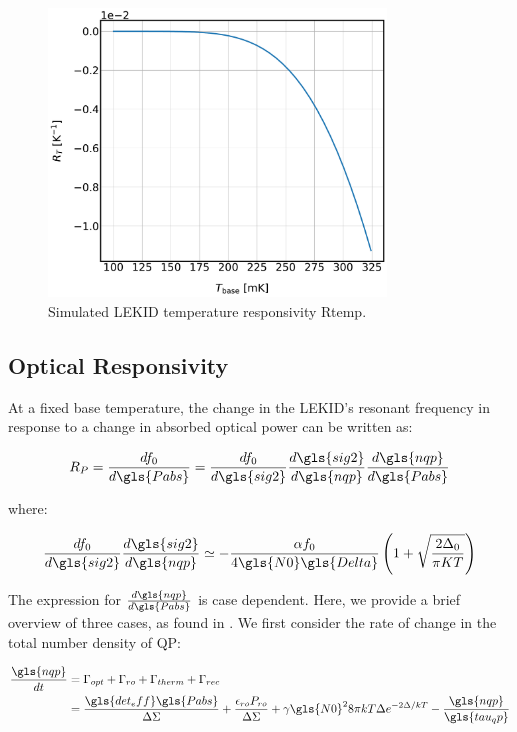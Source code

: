 \begin{figure}[!htbp]
\centering
\includegraphics[width=0.8\textwidth]{figures/kid_model/dfdT}
\caption[~Simulated LEKID temperature responsivity.]{Simulated LEKID temperature responsivity \gls{Rtemp}.}
\label{fig:dfdT}
\end{figure}

\subsection{Optical Responsivity}

At a fixed base temperature, the change in the LEKID's resonant frequency in response to a change in absorbed optical power can be written as:

\begin{equation}
    R_{P} = \frac{df_{0}}{d\gls{Pabs}} = \frac{df_{0}}{d\gls{sig2}} \frac{d\gls{sig2}}{d\gls{nqp}} \frac{d\gls{nqp}}{d\gls{Pabs}}
\end{equation}

where:

\begin{equation}
  \frac{df_{0}}{d\gls{sig2}}\frac{d\gls{sig2}}{d\gls{nqp}} \simeq -\frac{\alpha f_{0}} {4\gls{N0}\gls{Delta}} \left( 1 + \sqrt{ \frac{2 \Delta_{0}}{\pi K T}} \right)
\end{equation}

The expression for $\frac{d\gls{nqp}}{d\gls{Pabs}}$ is case dependent. Here, we provide a brief overview of three cases, as found in \citet{mauskopf2018transition}. We first consider the rate of change in the total number density of QP:

\begin{equation}\label{eq:dn_dt}
  \begin{aligned}
  \frac{\gls{nqp}}{dt} &= \Gamma_{opt} + \Gamma_{ro} + \Gamma_{therm} + \Gamma_{rec} \\
   &= \frac{\gls{det_eff} \gls{Pabs}}{\Delta \Sigma} + \frac{\epsilon_{ro} P_{ro}}{\Delta \Sigma} + \gamma \gls{N0}^{2} 8\pi k T \Delta e^{-2 \Delta / kT} -\frac{\gls{nqp}}{\gls{tau_qp}}
  \end{aligned}
\end{equation}

